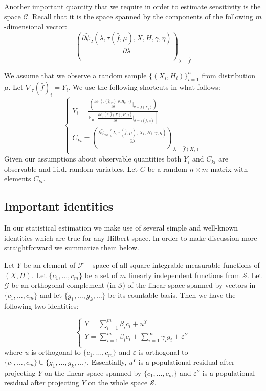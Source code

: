 \documentclass[12pt]{article}
\theoremstyle{plain}
\begin{document}
Another important quantity that we require in order to estimate sensitivity is the space $\mathcal{C}$. Recall that it is the space spanned by the components of the following $m$-dimensional vector:
\begin{equation}
\left(\frac{\partial \tilde{\psi}_2(\lambda,\tau(\hat f, \mu), X, H, \gamma, \eta)}{\partial \lambda}\right)_{\lambda = \hat f}
\end{equation}

We assume that we observe a random sample $\{(X_i,H_i)\}_{i=1}^n$ from distribution $\mu$. Let $\nabla_{\tau}(\hat f)_i = Y_i$. We use the following shortcuts in what follows:
\begin{equation}
\begin{cases}
Y_i =  \frac{\left(\frac{\partial \psi_1(\tau(\hat f,\mu),\theta, H_i,\gamma)}{\partial \theta}|_{\theta =\hat f(X_i)}\right)}{\mathbb{E}_{\mu}\left[\frac{\partial \psi_1(\theta, \hat f(X), H,\gamma)}{\partial \theta}|_{\theta = \tau(\hat f,\mu)}\right]}\\
C_{ki} = \left(\frac{\partial \tilde{\psi}_{2k}(\lambda,\tau(\hat f, \mu), X_i, H_i, \gamma, \eta)}{\partial \lambda}\right)_{\lambda = \hat f(X_i)} 
\end{cases}
\end{equation}
Given our assumptions about observable quantities both $Y_i$ and $C_{ki}$ are observable and i.i.d. random variables. Let $C$ be a random $n\times m$ matrix with elements $C_{ki}$.

\subsection{Important identities}  

In our statistical estimation we make use of several simple and well-known identities which are true for any Hilbert space. In order to make discussion more straightforward we summarize them below. 

Let $Y$ be an element of $\mathcal{F}$ -- space of all square-integrable measurable functions of $(X,H)$. Let $\{c_1,\dots, c_m\}$ be a set of $m$ linearly independent functions from $\mathcal{S}$. Let $\mathcal{G}$ be an orthogonal complement (in $\mathcal{S}$) of the linear space spanned by vectors in $\{c_1,\dots, c_m\}$ and let $\{g_1,\dots, g_k, \dots\}$ be its countable basis. Then we have the following two identities:

\begin{equation}\label{2rep_stat}
\begin{cases}
Y = \sum_{i=1}^m \beta_i c_i + u^Y\\
Y =  \sum_{i=1}^m \beta_i c_i +\sum_{i=1}^{\infty} \gamma_i g_i+ \varepsilon^Y\\
\end{cases}
\end{equation}
where $u$ is orthogonal to $\{c_1,\dots, c_m\}$ and $\varepsilon$ is orthogonal to $\{c_1,\dots, c_m\} \cup \{g_1, \dots, g_k,\dots\}$. Essentially, $u^Y$ is a populational residual after projecting $Y$ on the linear space spanned by $\{c_1,\dots, c_m\}$ and $\varepsilon^Y$ is a populational residual after projecting $Y$ on the whole space $\mathcal{S}$. 
\end{document}

